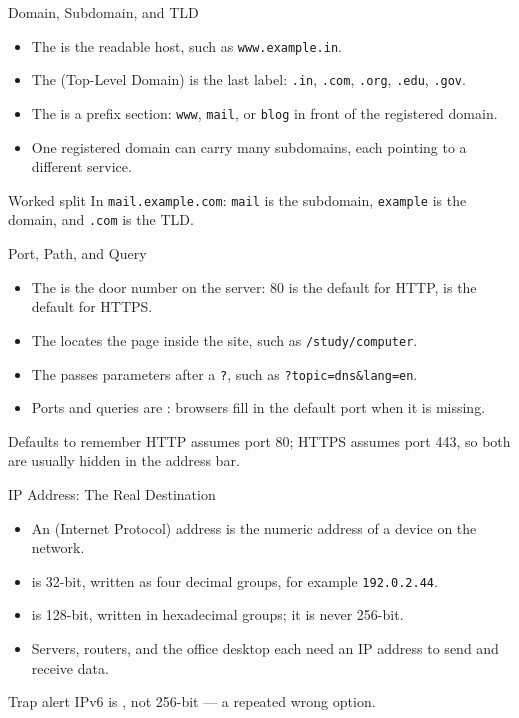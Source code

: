 \documentclass[aspectratio=169]{beamer}
\begin{document}
\begin{frame}{Domain, Subdomain, and TLD}
  \begin{itemize}
    \item The  is the readable host, such as
      \texttt{www.example.in}.
    \item The  (Top-Level Domain) is the last label: \texttt{.in},
      \texttt{.com}, \texttt{.org}, \texttt{.edu}, \texttt{.gov}.
    \item The  is a prefix section: \texttt{www},
      \texttt{mail}, or \texttt{blog} in front of the registered domain.
    \item One registered domain can carry many subdomains, each pointing to
      a different service.
  \end{itemize}
  \begin{exampleblock}{Worked split}
    In \texttt{mail.example.com}: \texttt{mail} is the subdomain,
    \texttt{example} is the domain, and \texttt{.com} is the TLD.
  \end{exampleblock}
\end{frame}

\begin{frame}{Port, Path, and Query}
  \begin{itemize}
    \item The  is the door number on the server: 80 is the
      default for HTTP,  is the default for HTTPS.
    \item The  locates the page inside the site, such as
      \texttt{/study/computer}.
    \item The  passes parameters after a \texttt{?}, such as
      \texttt{?topic=dns\&lang=en}.
    \item Ports and queries are : browsers fill in the
      default port when it is missing.
  \end{itemize}
  \begin{block}{Defaults to remember}
    HTTP assumes port 80; HTTPS assumes port 443, so both are usually
    hidden in the address bar.
  \end{block}
\end{frame}

\begin{frame}{IP Address: The Real Destination}
  \begin{itemize}
    \item An  (Internet Protocol) address is the numeric address of
      a device on the network.
    \item {} is 32-bit, written as four decimal groups, for example
      \texttt{192.0.2.44}.
    \item {} is 128-bit, written in hexadecimal groups; it is never
      256-bit.
    \item Servers, routers, and the office desktop each need an IP address
      to send and receive data.
  \end{itemize}
  \begin{alertblock}{Trap alert}
    IPv6 is , not 256-bit --- a repeated wrong option.
  \end{alertblock}
\end{frame}
\end{document}
